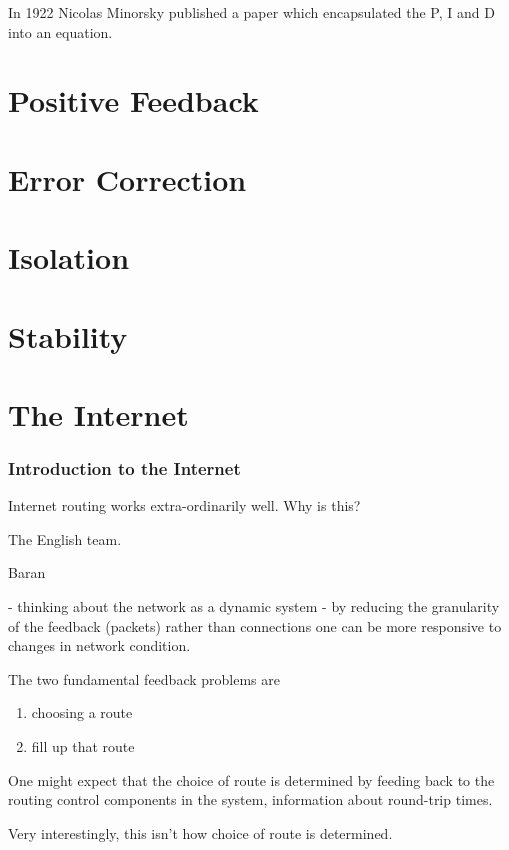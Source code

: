 In 1922 Nicolas Minorsky published a paper which encapsulated the P, I and D into an
equation.\cite{minorsky1922}

\section{Positive Feedback}

\section{Error Correction}

\section{Isolation}

\section{Stability}

\section{The Internet}

\subsubsection{Introduction to the Internet}

Internet routing works extra-ordinarily well. Why is this?

The English team.

Baran

- thinking about the network as a dynamic system
- by reducing the granularity of the feedback (packets) rather than connections one can be more
  responsive to changes in network condition.


The two fundamental feedback problems are

\begin{enumerate}
    \item choosing a route
    \item fill up that route
\end{enumerate}


One might expect that the choice of route is determined by feeding back to the routing control
components in the system, information about round-trip times.

Very interestingly, this isn't how choice of route is determined.

